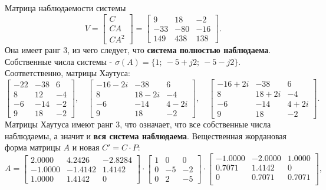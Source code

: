 Матрица наблюдаемости системы
\begin{equation*}
    V=\begin{bmatrix}
        C \\ CA \\ CA^2
    \end{bmatrix}
    =\begin{bmatrix}
        9 & 18 & -2 \\
        -33 & -80 & -16 \\
        149 & 438 & 138
    \end{bmatrix}.
\end{equation*}
Она имеет ранг 3, из чего следует, что \textbf{система полностью наблюдаема}. Собственные
числа системы - $\sigma(A)=\{1;\ -5+j2;\ -5-j2\}$. Соответственно,
матрицы Хаутуса:
\begin{equation*}
    \begin{bmatrix}
        -22&	-38&	6\\
        8&	12&	-4\\
        -6&	-14&	-2\\
        9&	18&	-2
    \end{bmatrix},\quad
    \begin{bmatrix}
        -16 - 2i&	-38&	6\\
        8&	18 - 2i&	-4\\
        -6&	-14&	4 - 2i\\
        9&	18&	-2
    \end{bmatrix},\quad
    \begin{bmatrix}
        -16 + 2i&	-38&	6\\
8&	18 + 2i&	-4\\
-6&	-14&	4 + 2i\\
9&	18&	-2
    \end{bmatrix}.
\end{equation*}
Матрицы Хаутуса имеют ранг 3, что означает, что все собственные
числа наблюдаемы, а значит и \textbf{вся система наблюдаема}.
Вещественная жордановая форма матрицы $A$ и новая $C'=C\cdot P$:
\begin{equation*}
    A = \begin{bmatrix}
        2.0000&    4.2426   &-2.8284\\
        -1.0000&   -1.4142 &   1.4142\\
         1.0000 &   1.4142&         0
    \end{bmatrix}\cdot
    \begin{bmatrix}
        1&     0  &   0\\
        0 &   -5 &   -2\\
        0  &   2&    -5
    \end{bmatrix}\cdot
    \begin{bmatrix}
        -1.0000&   -2.0000 &   1.0000\\
        0.7071  &  1.4142 &        0\\
             0   & 0.7071&    0.7071\\
    \end{bmatrix},
\end{equation*}
